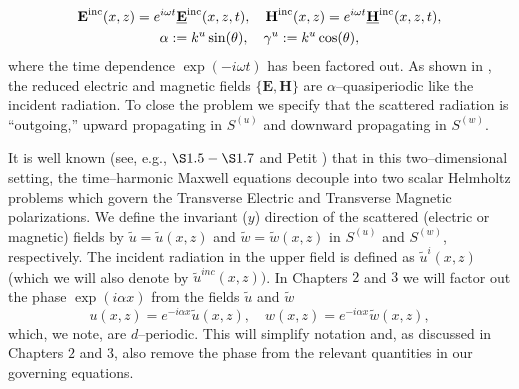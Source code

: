 \begin{gather*}
\textbf{E}^{\text{inc}}(x,z) = e^{i \omega t} \textbf{\underline{E}}^{\text{inc}}(x,z,t),
\quad
\textbf{H}^{\text{inc}}(x,z) = e^{i \omega t} \textbf{\underline{H}}^{\text{inc}}(x,z,t), \\
\alpha := k^u \sin(\theta),
\quad
\gamma^u := k^u \cos(\theta),
\end{gather*}
where the time dependence $\exp(-i\omega t)$ has been factored out. 
As shown in \cite{Petit80}, the reduced electric and magnetic fields
$\{\textbf{E},\textbf{H}\}$ are $\alpha$--quasiperiodic like the incident radiation.
To close the problem we specify that the scattered radiation is ``outgoing,'' 
upward propagating in $S^{(u)}$ and downward propagating in $S^{(w)}$.

It is well known (see, e.g., $\S 1.5-\S 1.7$ and Petit \cite{Petit80}) that in this 
two--dimensional setting, the time--harmonic Maxwell equations decouple into two 
scalar Helmholtz problems which govern the Transverse Electric and 
Transverse Magnetic polarizations. We define the invariant ($y$) direction
of the scattered (electric or magnetic) fields by $\tilde{u} = \tilde{u}(x,z)$
and $\tilde{w} = \tilde{w}(x,z)$ in $S^{(u)}$ and $S^{(w)}$, respectively. The incident radiation in the upper field is defined as $\tilde{u}^i(x,z)$ (which we will also denote by $\tilde{u}^{inc}(x,z))$. In Chapters $2$ and $3$ we will factor out the phase
$\exp(i \alpha x)$ from the fields $\tilde{u}$ and $\tilde{w}$
$$
u(x,z) = e^{-i \alpha x} \tilde{u}(x,z),
\quad
w(x,z) = e^{-i \alpha x} \tilde{w}(x,z),
$$
which, we note, are $d$--periodic. This will simplify notation and, as discussed in  Chapters $2$ and $3$, also remove the phase from the relevant quantities in our governing equations.